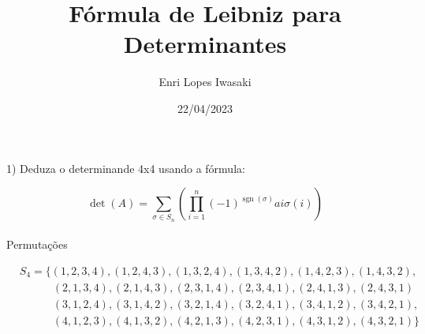 \documentclass[12pt]{article}
\title{F\'{o}rmula de Leibniz para Determinantes}
\author{Enri Lopes Iwasaki}
\date{22/04/2023}
\begin{document}
\maketitle

1) Deduza o determinande 4x4 usando a f\'{o}rmula:   

$$\operatorname{det}(A)=\sum_{\sigma \in S_{n}}  \left(\prod_{i=1}^{n} (-1)^ {\operatorname{sgn}(\sigma)}  ai \sigma (i) \right)$$

\paragraph{}
\begin{center}
    Permuta\c{c}\~{o}es
\end{center}
$
\begin{aligned} 
    & S_{4}= {\{(1,2,3,4),(1,2,4,3),(1,3,2,4),(1,3,4,2),(1,4,2,3),(1,4,3,2),} \\ & \qquad \quad 
    (2,1,3,4),(2,1,4,3),(2,3,1,4),(2,3,4,1),(2,4,1,3),(2,4,3,1) \\ & \qquad \quad 
    (3,1,2,4),(3,1,4,2),(3,2,1,4),(3,2,4,1),(3,4,1,2),(3,4,2,1), \\ & \qquad \quad 
    (4,1,2,3),(4,1,3,2),(4,2,1,3),(4,2,3,1),(4,3,1,2),(4,3,2,1)\}
\end{aligned}
$
\end{document}
